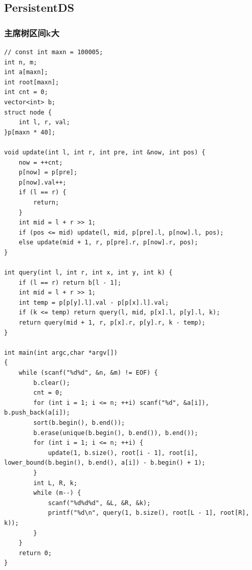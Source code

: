 \documentclass[twoside]{article}
\begin{document}
\subsection{PersistentDS}
\subsubsection{主席树区间k大}
\begin{lstlisting}
// const int maxn = 100005;
int n, m;
int a[maxn];
int root[maxn];
int cnt = 0;
vector<int> b;
struct node {
    int l, r, val;
}p[maxn * 40];

void update(int l, int r, int pre, int &now, int pos) {
    now = ++cnt;
    p[now] = p[pre];
    p[now].val++;
    if (l == r) {
        return;
    }
    int mid = l + r >> 1;
    if (pos <= mid) update(l, mid, p[pre].l, p[now].l, pos);
    else update(mid + 1, r, p[pre].r, p[now].r, pos);
}

int query(int l, int r, int x, int y, int k) {
    if (l == r) return b[l - 1];
    int mid = l + r >> 1;
    int temp = p[p[y].l].val - p[p[x].l].val;
    if (k <= temp) return query(l, mid, p[x].l, p[y].l, k);
    return query(mid + 1, r, p[x].r, p[y].r, k - temp);
}

int main(int argc,char *argv[])
{
    while (scanf("%d%d", &n, &m) != EOF) {
        b.clear();
        cnt = 0;
        for (int i = 1; i <= n; ++i) scanf("%d", &a[i]), b.push_back(a[i]);
        sort(b.begin(), b.end());
        b.erase(unique(b.begin(), b.end()), b.end());
        for (int i = 1; i <= n; ++i) {
            update(1, b.size(), root[i - 1], root[i], lower_bound(b.begin(), b.end(), a[i]) - b.begin() + 1);
        }
        int L, R, k;
        while (m--) {
            scanf("%d%d%d", &L, &R, &k);
            printf("%d\n", query(1, b.size(), root[L - 1], root[R], k));
        }
    }
    return 0;
}\end{lstlisting}
\end{document}
